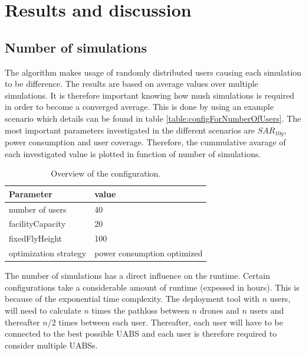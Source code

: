 \chapter{Results and discussion}
\section{Number of simulations}

The  algorithm makes usage of randomly distributed users causing each simulation to be difference. The results are based on average 
values over multiple simulations. It is therefore important knowing how mush simulations is required in order to become a converged average.
This is done by using an example scenario which details can be found in table \ref{table:configForNumberOfUsers}. The most important parameters
investigated in the different scenarios are $SAR_{10g}$, power consumption and user coverage. Therefore, the cummulative avarage of each investigated 
value is plotted in function of number of simulations.

\begin{table}[!htb]
\centering
  \begin{tabular}{|l|l|}
  \hline
  Parameter               & value          \\   \hline 
  number of users               & 40            \\ 
  facilityCapacity                    & 20           \\ 
  fixedFlyHeight               & 100           \\ 
  optimization strategy               & power consumption optimized           \\ 
  \hline
  \end{tabular}
  \caption{Overview of the configuration.}
  \label{table:confOverviewScenario2}
\end{table}

The number of simulations has a direct influence on the runtime. Certain configurations take a considerable amount of runtime (expessed in hours). This is because of the
exponential time complexity. The deployment tool with $n$ users, will need to calculate $n$ times the pathloss between $n$ drones and $n$ users and thereafter $n/2$ times between
each user. Thereafter, each user will have to be connected to the best possible \gls{UABS} and each user is therefore required to consider multiple \gls{UABS}s.

